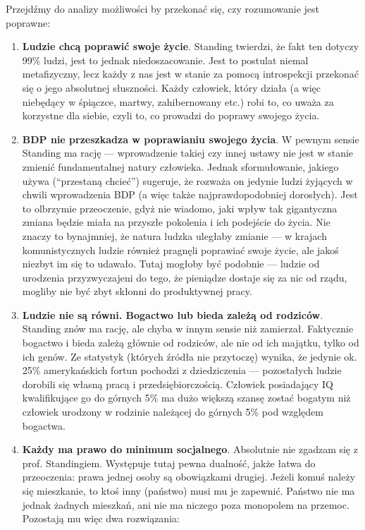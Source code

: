 \documentclass[11pt]{article}
\begin{document}
	\par Przejdźmy do analizy możliwości by przekonać się, czy rozumowanie jest poprawne:
	\begin{enumerate}
		\item \textbf{Ludzie chcą poprawić swoje życie}. Standing twierdzi, że fakt ten dotyczy 99\% ludzi, jest to jednak niedoszacowanie. Jest to postulat niemal metafizyczny, lecz każdy z nas jest w stanie za pomocą introspekcji przekonać się o jego absolutnej słuszności. Każdy człowiek, który działa (a więc niebędący w śpiączce, martwy, zahibernowany etc.) robi to, co uważa za korzystne dla siebie, czyli to, co prowadzi do poprawy swojego życia.
		\item \textbf{BDP nie przeszkadza w poprawianiu swojego życia}. W pewnym sensie Standing ma rację — wprowadzenie takiej czy innej ustawy nie jest w stanie zmienić fundamentalnej natury człowieka. Jednak sformułowanie, jakiego używa (``przestaną chcieć'') sugeruje, że rozważa on jedynie ludzi żyjących w chwili wprowadzenia BDP (a więc także najprawdopodobniej dorosłych). Jest to olbrzymie przeoczenie, gdyż nie wiadomo, jaki wpływ tak gigantyczna zmiana będzie miała na przyszłe pokolenia i ich podejście do życia. Nie znaczy to bynajmniej, że natura ludzka uległaby zmianie — w krajach komunistycznych ludzie również pragnęli poprawiać swoje życie, ale jakoś niezbyt im się to udawało. Tutaj mogłoby być podobnie — ludzie od urodzenia przyzwyczajeni do tego, że pieniądze dostaje się za nic od rządu, mogliby nie być zbyt skłonni do produktywnej pracy.
		\item \textbf{Ludzie nie są równi. Bogactwo lub bieda zależą od rodziców}. Standing znów ma rację, ale chyba w innym sensie niż zamierzał. Faktycznie bogactwo i bieda zależą głównie od rodziców, ale nie od ich majątku, tylko od ich genów. Ze statystyk (których źródła nie przytoczę) wynika, że jedynie ok. 25\% amerykańskich fortun pochodzi z dziedziczenia — pozostałych ludzie dorobili się własną pracą i przedsiębiorczością. Człowiek posiadający IQ kwalifikujące go do górnych 5\% ma dużo większą szansę zostać bogatym niż człowiek urodzony w rodzinie należącej do górnych 5\% pod względem bogactwa.
		\item \textbf{Każdy ma prawo do minimum socjalnego}. Absolutnie nie zgadzam się z prof. Standingiem. Występuje tutaj pewna dualność, jakże łatwa do przeoczenia: prawa jednej osoby są obowiązkami drugiej. Jeżeli komuś należy się mieszkanie, to ktoś inny (państwo) musi mu je zapewnić. Państwo nie ma jednak żadnych mieszkań, ani nie ma niczego poza monopolem na przemoc. Pozostają mu więc dwa rozwiązania:

\end{enumerate}
\end{document}
